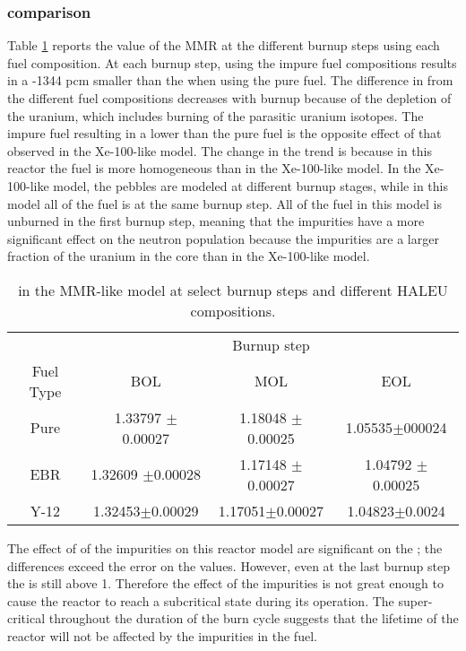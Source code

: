 \subsubsection{\keff comparison}
Table \ref{tab:mmr_keff} reports the \keff value of the \gls{MMR} at the 
different burnup steps using each fuel composition. At each burnup step, 
using the impure fuel compositions results in a -1344 pcm 
smaller than the \keff when using the pure fuel. The difference in \keff 
from the different fuel compositions decreases with burnup because of 
the depletion of the uranium, which includes burning of the parasitic 
uranium isotopes. The impure fuel resulting in a lower \keff 
than the pure fuel is the opposite 
effect of that observed in the Xe-100-like model. The change in the trend 
is because in this reactor the fuel is more homogeneous than in 
the Xe-100-like model. In the Xe-100-like model, the pebbles are modeled 
at different burnup stages, while in this model all of the fuel is at the 
same burnup step. All of the fuel in this model is unburned in the 
first burnup step, meaning that the impurities have a more significant 
effect on the neutron population because the impurities are a larger fraction 
of the uranium in the core than in the Xe-100-like model.

\begin{table}[ht]
        \centering
        \caption{\keff in the \gls{MMR}-like model at select burnup 
        steps and different \gls{HALEU} compositions.}
        \label{tab:mmr_keff}
        \begin{tabular}{c c c c}
                \hline 
                & \multicolumn{3}{c}{Burnup step}\\
                Fuel Type & \gls{BOL} & \gls{MOL} & \gls{EOL} \\
                \hline 
                Pure & 1.33797 $\pm$ 0.00027 & 1.18048 $\pm$ 0.00025 & 1.05535$\pm$000024\\
                \gls{EBR} & 1.32609 $\pm$0.00028 & 1.17148 $\pm$ 0.00027 & 1.04792 $\pm$ 0.00025 \\
                Y-12 & 1.32453$\pm$0.00029 & 1.17051$\pm$0.00027 & 1.04823$\pm$0.0024\\
                \hline
                
        \end{tabular}
\end{table}

The effect of of the impurities on this reactor model are significant on the 
\keff; the differences exceed the error on the values. However, 
even at the last burnup step the \keff is still above 1. Therefore the 
effect of the impurities 
is not great enough to cause the reactor to reach a subcritical state 
during its operation. The super-critical \keff throughout the duration 
of the burn cycle suggests that the lifetime of the reactor will not be 
affected by the impurities in the fuel.

